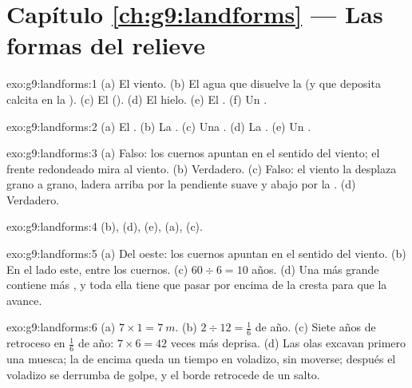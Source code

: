 \section*{Capítulo \ref{ch:g9:landforms} --- Las formas del relieve}

\begin{solution}{exo:g9:landforms:1}
(a) El viento. (b) El agua que disuelve la  (y que deposita calcita en
la ). (c) El  (). (d) El hielo. (e) El . (f) Un
.
\end{solution}

\begin{solution}{exo:g9:landforms:2}
(a) El . (b) La . (c) Una . (d) La
. (e) Un .
\end{solution}

\begin{solution}{exo:g9:landforms:3}
(a) Falso: los cuernos apuntan en el sentido del viento; el frente
redondeado mira al viento. (b) Verdadero. (c) Falso: el viento la desplaza
grano a grano, ladera arriba por la pendiente suave y abajo por la . (d) Verdadero.
\end{solution}

\begin{solution}{exo:g9:landforms:4}
(b), (d), (e), (a), (c).
\end{solution}

\begin{solution}{exo:g9:landforms:5}
(a) Del oeste: los cuernos apuntan en el sentido del viento. (b) En el
lado este, entre los cuernos. (c) $60 \div 6 = 10$ años. (d) Una  más
grande contiene más , y toda ella tiene que pasar por encima de la
cresta para que la  avance.
\end{solution}

\begin{solution}{exo:g9:landforms:6}
(a) $7 \times 1 = \qty{7}{m}$. (b) $2 \div 12 = \frac{1}{6}$ de año.
(c) Siete años de retroceso en $\frac{1}{6}$ de año: $7 \times 6 = 42$
veces más deprisa. (d) Las olas excavan primero una muesca; la  de
encima queda un tiempo en voladizo, sin moverse; después el voladizo se
derrumba de golpe, y el borde retrocede de un salto.
\end{solution}


